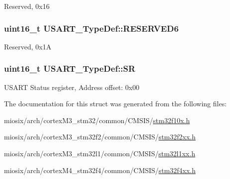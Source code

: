 Reserved, 0x16 \hypertarget{struct_u_s_a_r_t___type_def_acd89bb1cba0381c2be8a551e6d14e9f7}{
\subsubsection[{R\-E\-S\-E\-R\-V\-E\-D6}]{\setlength{\rightskip}{0pt plus 5cm}uint16\-\_\-t U\-S\-A\-R\-T\-\_\-\-Type\-Def\-::\-R\-E\-S\-E\-R\-V\-E\-D6}}\label{struct_u_s_a_r_t___type_def_acd89bb1cba0381c2be8a551e6d14e9f7}
Reserved, 0x1\-A \hypertarget{struct_u_s_a_r_t___type_def_a3f1fd9f0c004d3087caeba4815faa41c}{
\subsubsection[{S\-R}]{ uint16\-\_\-t U\-S\-A\-R\-T\-\_\-\-Type\-Def\-::\-S\-R}}\label{struct_u_s_a_r_t___type_def_a3f1fd9f0c004d3087caeba4815faa41c}
U\-S\-A\-R\-T Status register, Address offset\-: 0x00 

The documentation for this struct was generated from the following files\-:\begin{DoxyCompactItemize}
\item 
miosix/arch/cortex\-M3\-\_\-stm32/common/\-C\-M\-S\-I\-S/\hyperlink{stm32f10x_8h}{stm32f10x.\-h}\item 
miosix/arch/cortex\-M3\-\_\-stm32f2/common/\-C\-M\-S\-I\-S/\hyperlink{stm32f2xx_8h}{stm32f2xx.\-h}\item 
miosix/arch/cortex\-M3\-\_\-stm32l1/common/\-C\-M\-S\-I\-S/\hyperlink{stm32l1xx_8h}{stm32l1xx.\-h}\item 
miosix/arch/cortex\-M4\-\_\-stm32f4/common/\-C\-M\-S\-I\-S/\hyperlink{stm32f4xx_8h}{stm32f4xx.\-h}\end{DoxyCompactItemize}
